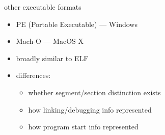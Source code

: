 
\begin{frame}{other executable formats}
    \begin{itemize}
    \item PE (Portable Executable) --- Windows
    \item Mach-O --- MacOS X
    \item broadly similar to ELF
    \item differences:  
        \begin{itemize}
        \item whether segment/section distinction exists
        \item how linking/debugging info represented
        \item how program start info represented
        \end{itemize}
    \end{itemize}
\end{frame}


